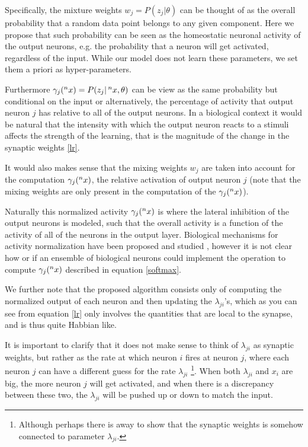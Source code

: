 \documentclass{article}
\begin{document}
Specifically, the mixture weights \(w_j = P(z_j | \theta)\) can be
thought of as the overall probability that a random data point belongs
to any given component. Here we propose that such probability can be
seen as the homeostatic neuronal activity of the output neurons,
e.g. the probability that a neuron will get activated, regardless of the
input. While our model does not learn these parameters, we set them
a priori as hyper-parameters.
 
Furthermore \(\gamma_j(\prescript{n}{}{x}) = P (z_j | \prescript{n}{}{x}, \theta)\) can be view as the
same probability but conditional on the input or alternatively, the
percentage of activity that output neuron \(j\) has relative to all of
the output neurons. In a biological context it would be natural that the
intensity with which the output neuron reacts to a stimuli affects the
strength of the learning, that is the magnitude of the change in the
synaptic weights \eqref{lr}.
 
It would also makes sense
that the mixing weights \(w_j\) are taken into account for the
computation \(\gamma_j(\prescript{n}{}{x})\), the relative activation of output neuron
\(j\) (note that the mixing weights are only present in the computation
of the \(\gamma_j(\prescript{n}{}{x})\)).
 
Naturally this normalized activity \(\gamma_j(\prescript{n}{}{x})\) is where the
lateral inhibition of the output neurons is modeled, such that the overall
activity is a function of the activity of all of the neurons in the
output layer. Biological mechanisms for activity normalization have been proposed and studied \cite{carandini1994} \cite{carandini2012} \cite{pouille2009}, however it is not clear how or if an ensemble of biological neurons could implement the
operation to compute \(\gamma_j(\prescript{n}{}{x})\) described in equation \eqref{softmax}.
 
We further note that the proposed algorithm consists only of computing
the normalized output of each neuron and then updating the $\lambda_{ji}$'s, which as you can see from equation \eqref{lr}
only involves the quantities that are local to the synapse, and is thus quite
Habbian like.
 
It is important to clarify that it does not make
sense to think of $\lambda_{ji}$ as synaptic weights, but rather as the rate at which neuron $i$ fires at neuron $j$,
where each neuron $j$ can have a different guess for the rate $\lambda_{ji}$ \footnote{Although perhaps there is away to show that the synaptic weights is somehow connected to parameter \(\lambda_{ji}\).}.
When both $\lambda_{ji}$ and $x_i$ are big, the more neuron $j$ will get activated, and when there is a discrepancy between these two, the $\lambda_{ji}$ will be pushed up or down to match the input.
 
\end{document}
